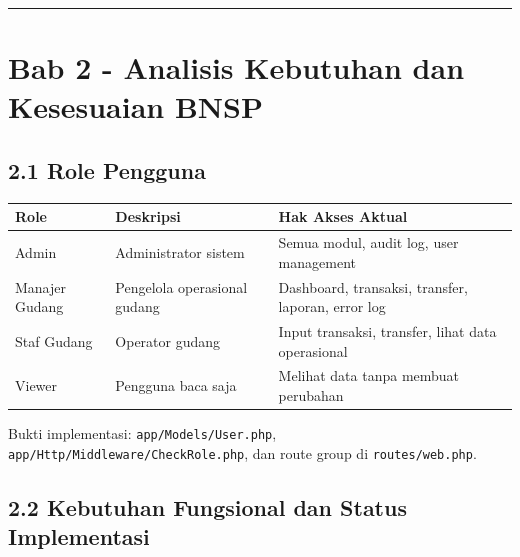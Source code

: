\documentclass[
]{article}
\begin{document}
\begin{center}\rule{0.5\linewidth}{0.5pt}\end{center}

\section{Bab 2 - Analisis Kebutuhan dan Kesesuaian
BNSP}\label{bab-2---analisis-kebutuhan-dan-kesesuaian-bnsp}

\subsection{2.1 Role Pengguna}\label{21-role-pengguna}

\begin{longtable}[]{@{}P{0.20\textwidth}P{0.26\textwidth}P{0.50\textwidth}@{}}
\toprule\noalign{}
Role & Deskripsi & Hak Akses Aktual \\
\midrule\noalign{}
\endhead
\bottomrule\noalign{}
\endlastfoot
Admin & Administrator sistem & Semua modul, audit log, user
management \\
Manajer Gudang & Pengelola operasional gudang & Dashboard, transaksi,
transfer, laporan, error log \\
Staf Gudang & Operator gudang & Input transaksi, transfer, lihat data
operasional \\
Viewer & Pengguna baca saja & Melihat data tanpa membuat perubahan \\
\end{longtable}

Bukti implementasi: \texttt{app/Models/User.php},
\texttt{app/Http/Middleware/CheckRole.php}, dan route group di
\texttt{routes/web.php}.

\subsection{2.2 Kebutuhan Fungsional dan Status
Implementasi}\label{22-kebutuhan-fungsional-dan-status-implementasi}
\end{document}
